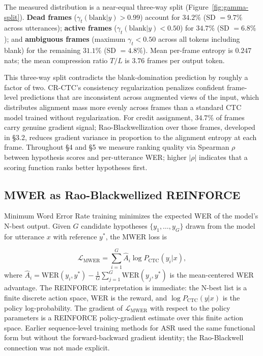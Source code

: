 The measured distribution is a near-equal three-way split (Figure~\ref{fig:gamma-split}). \textbf{Dead frames} ($\gamma_t(\text{blank}|y) > 0.99$) account for $34.2\%$ (SD $= 9.7\%$ across utterances); \textbf{active frames} ($\gamma_t(\text{blank}|y) < 0.50$) for $34.7\%$ (SD $= 6.8\%$); and \textbf{ambiguous frames} (maximum $\gamma_t < 0.50$ across all tokens including blank) for the remaining $31.1\%$ (SD $= 4.8\%$). Mean per-frame entropy is $0.247$ nats; the mean compression ratio $T/L$ is $3.76$ frames per output token.

This three-way split contradicts the blank-domination prediction by roughly a factor of two. CR-CTC's consistency regularization \cite{huang2024crctc} penalizes confident frame-level predictions that are inconsistent across augmented views of the input, which distributes alignment mass more evenly across frames than a standard CTC model trained without regularization. For credit assignment, $34.7\%$ of frames carry genuine gradient signal; Rao-Blackwellization over those frames, developed in §3.2, reduces gradient variance in proportion to the alignment entropy at each frame. Throughout §4 and §5 we measure ranking quality via Spearman $\rho$ between hypothesis scores and per-utterance WER; higher $|\rho|$ indicates that a scoring function ranks better hypotheses first.



\subsection{MWER as Rao-Blackwellized REINFORCE}

Minimum Word Error Rate training \cite{prabhavalkar2018mwer} minimizes the expected WER of the model's N-best output. Given $G$ candidate hypotheses $\{y_1, \ldots, y_G\}$ drawn from the model for utterance $x$ with reference $y^*$, the MWER loss is

\begin{equation*}
\mathcal{L}_\text{MWER} = \sum_{i=1}^{G} \hat{A}_i \log P_\text{CTC}(y_i|x), \tag{4}
\end{equation*}
where $\hat{A}_i = \text{WER}(y_i, y^*) - \frac{1}{G}\sum_{j=1}^{G} \text{WER}(y_j, y^*)$ is the mean-centered WER advantage. The REINFORCE interpretation \cite{williams1992} is immediate: the N-best list is a finite discrete action space, WER is the reward, and $\log P_\text{CTC}(y|x)$ is the policy log-probability. The gradient of $\mathcal{L}_\text{MWER}$ with respect to the policy parameters is a REINFORCE policy-gradient estimate over this finite action space. Earlier sequence-level training methods for ASR \cite{shannon2017} used the same functional form but without the forward-backward gradient identity; the Rao-Blackwell connection was not made explicit.

